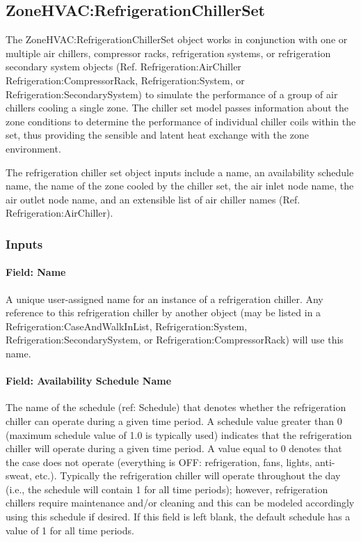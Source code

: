 \subsection{ZoneHVAC:RefrigerationChillerSet}\label{zonehvacrefrigerationchillerset}

The ZoneHVAC:RefrigerationChillerSet object works in conjunction with one or multiple air chillers, compressor racks, refrigeration systems, or refrigeration secondary system objects (Ref. Refrigeration:AirChiller Refrigeration:CompressorRack, Refrigeration:System, or Refrigeration:SecondarySystem) to simulate the performance of a group of air chillers cooling a single zone. The chiller set model passes information about the zone conditions to determine the performance of individual chiller coils within the set, thus providing the sensible and latent heat exchange with the zone environment.

The refrigeration chiller set object inputs include a name, an availability schedule name, the name of the zone cooled by the chiller set, the air inlet node name, the air outlet node name, and an extensible list of air chiller names (Ref. Refrigeration:AirChiller).

\subsubsection{Inputs}\label{inputs-10-024}

\paragraph{Field: Name}\label{field-name-10-020}

A unique user-assigned name for an instance of a refrigeration chiller. Any reference to this refrigeration chiller by another object (may be listed in a Refrigeration:CaseAndWalkInList, Refrigeration:System, Refrigeration:SecondarySystem, or Refrigeration:CompressorRack) will use this name.

\paragraph{Field: Availability Schedule Name}\label{field-availability-schedule-name-9-002}

The name of the schedule (ref: Schedule) that denotes whether the refrigeration chiller can operate during a given time period. A schedule value greater than 0 (maximum schedule value of 1.0 is typically used) indicates that the refrigeration chiller will operate during a given time period. A value equal to 0 denotes that the case does not operate (everything is OFF: refrigeration, fans, lights, anti-sweat, etc.). Typically the refrigeration chiller will operate throughout the day (i.e., the schedule will contain 1 for all time periods); however, refrigeration chillers require maintenance and/or cleaning and this can be modeled accordingly using this schedule if desired. If this field is left blank, the default schedule has a value of 1 for all time periods.

